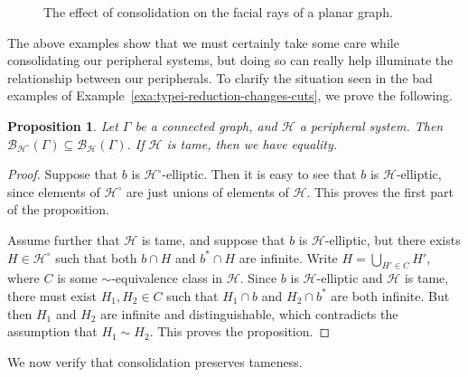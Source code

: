 \documentclass[11pt,a4paper]{amsart}
\newtheorem{proposition}[theorem]{Proposition}
\theoremstyle{definition}
\newcommand{\per}{\mathcal{H}}
\newcommand{\br}{{\mathscr{B}}}
\begin{document}
\begin{figure}

    \caption{The effect of consolidation on the facial rays of a planar graph.}
    \label{fig:planar-consol-example}
\end{figure}

The above examples show that we must certainly take some care while consolidating our peripheral systems, but doing so can really help illuminate the relationship between our peripherals.
To clarify the situation seen in the bad examples of Example~\ref{exa:typei-reduction-changes-cuts}, we prove the following. 

\begin{proposition}\label{prop:consol-preserves-cuts-when-tame}
    Let $\Gamma$ be a connected graph, and $\per$ a peripheral system. Then $\br_{\per^\circ}(\Gamma) \subseteq \br_\per(\Gamma)$. If $\per$ is tame, then we have equality.
\end{proposition}

\begin{proof}
    Suppose that $b$ is $\per^\circ$-elliptic. Then it is easy to see that $b$ is $\per$-elliptic, since elements of $\per^\circ$ are just unions of elements of $\per$. This proves the first part of the proposition.
    
    Assume further that $\per$ is tame, and suppose that $b$ is $\per$-elliptic, but there exists $H \in \per^\circ$ such that both $b \cap H$ and $b^\ast \cap H$ are infinite. Write 
    $
    H = \bigcup_{H' \in C} H'
    $, 
    where $C$ is some $\sim$-equivalence class in $\per$. Since $b$ is $\per$-elliptic and $\per$ is tame, there must exist $H_1, H_2 \in C$ such that $H_1 \cap b$ and $H_2 \cap b^\ast$ are both infinite. But then $H_1$ and $H_2$ are infinite and distinguishable, which contradicts the assumption that $H_1 \sim H_2$. This proves the proposition.
\end{proof}




We now verify that consolidation preserves tameness. 
\end{document}
